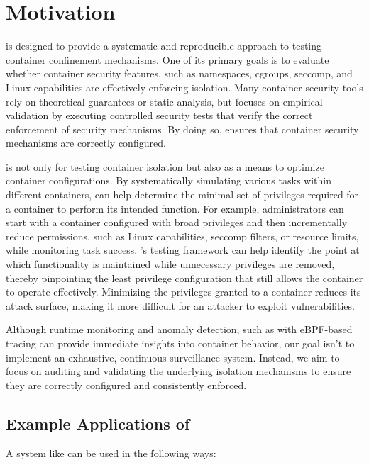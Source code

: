 \section{Motivation}
\label{sec:motivation}

\houdini is designed to provide a systematic and reproducible approach to testing container confinement mechanisms. One of its primary goals is to evaluate whether container security features, such as namespaces, cgroups, seccomp, and Linux capabilities are effectively enforcing isolation. Many container security tools rely on theoretical guarantees or static analysis\cite{clair}, but \houdini focuses on empirical validation by executing controlled security tests that verify the correct enforcement of security mechanisms. By doing so, \houdini ensures that container security mechanisms are correctly configured.

\houdini is not only for testing container isolation but also as a means to optimize container configurations. By systematically simulating various tasks within different containers, \houdini can help determine the minimal set of privileges required for a container to perform its intended function. For example, administrators can start with a container configured with broad privileges and then incrementally reduce permissions, such as Linux capabilities, seccomp filters, or resource limits, while monitoring task success. \houdini's testing framework can help identify the point at which functionality is maintained while unnecessary privileges are removed, thereby pinpointing the least privilege configuration that still allows the container to operate effectively. Minimizing the privileges granted to a container reduces its attack surface, making it more difficult for an attacker to exploit vulnerabilities.

Although runtime monitoring and anomaly detection, such as with eBPF-based tracing\cite{findlay2021bpfcontain} can provide immediate insights into container behavior, our goal isn't to implement an exhaustive, continuous surveillance system. Instead, we aim to focus on auditing and validating the underlying isolation mechanisms to ensure they are correctly configured and consistently enforced.

\subsection{Example Applications of \houdini}
A system like \houdini can be used in the following ways: 

